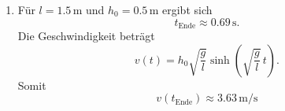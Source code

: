 \begin{enumerate}
\begin{enumerate}
              \item Für \(l=1.5\,\mathrm{m}\) und \(h_0=0.5\,\mathrm{m}\)
                    ergibt sich
                    \[
                        t_{\mathrm{Ende}}\approx 0.69\,\mathrm{s}.
                    \]
                    Die Geschwindigkeit beträgt
                    \[
                        v(t)=h_0\sqrt{\frac{g}{l}}
                        \sinh\left(\sqrt{\frac{g}{l}}\,t\right).
                    \]
                    Somit
                    \[
                        \boxed{
                            v(t_{\mathrm{Ende}})
                            \approx 3.63\,\mathrm{m/s}
                        }
                    \]
          \end{enumerate}
\end{enumerate}